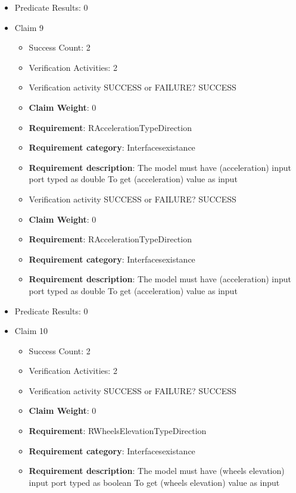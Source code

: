 \documentclass{article}
\begin{document}
\begin{itemize}
\begin{itemize}
				\end{itemize}
				
									    
				\item Predicate Results: 0

  				  \item Claim 9
				\begin{itemize}
			    	\item Success Count: 2 
			    	\item Verification Activities: 2
					\item Verification activity SUCCESS or FAILURE? SUCCESS
					\item \textbf{Claim Weight}: 0
						\item \textbf{Requirement}: RAccelerationTypeDirection 
						\item \textbf{Requirement category}: Interfacesexistance 
						\item \textbf{Requirement description}: The model must have (acceleration) input port typed as double To get (acceleration) value as input
					
					\item Verification activity SUCCESS or FAILURE? SUCCESS
					\item \textbf{Claim Weight}: 0
						\item \textbf{Requirement}: RAccelerationTypeDirection 
						\item \textbf{Requirement category}: Interfacesexistance 
						\item \textbf{Requirement description}: The model must have (acceleration) input port typed as double To get (acceleration) value as input
					
				\end{itemize}
				
									    
				\item Predicate Results: 0

  				  \item Claim 10
				\begin{itemize}
			    	\item Success Count: 2 
			    	\item Verification Activities: 2
					\item Verification activity SUCCESS or FAILURE? SUCCESS
					\item \textbf{Claim Weight}: 0
						\item \textbf{Requirement}: RWheelsElevationTypeDirection 
						\item \textbf{Requirement category}: Interfacesexistance 
						\item \textbf{Requirement description}: The model must have (wheels elevation) input port typed as boolean To get (wheels elevation) value as input
					

\end{itemize}
\end{itemize}
\end{document}
